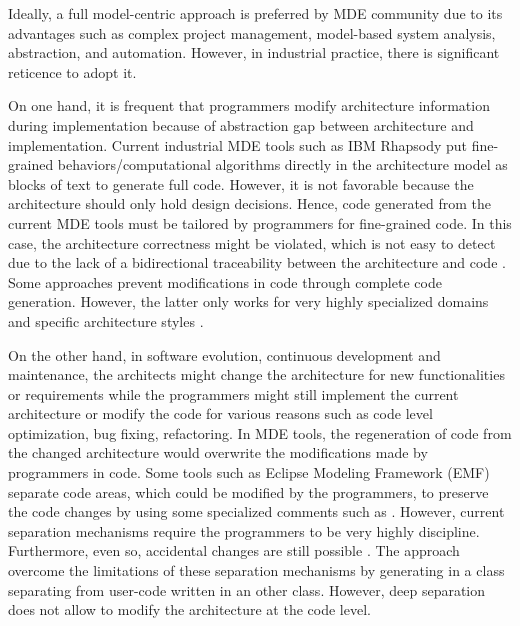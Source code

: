 Ideally, a full model-centric approach is preferred by MDE community due to its advantages \cite{Selic2012} such as complex project management, model-based system analysis, abstraction, and automation. 
However, in industrial practice, there is significant reticence \cite{Hutchinson:2011:MEP:1985793.1985882} to adopt it.

On one hand, it is frequent that programmers modify architecture information during implementation because of abstraction gap between architecture and implementation. %
Current industrial MDE tools such as IBM Rhapsody put fine-grained behaviors/computational algorithms directly in the architecture model as blocks of text to generate full code. 
However, it is %
not favorable because the architecture should only hold design decisions. 
Hence, code generated from the current MDE tools must be tailored by programmers for fine-grained code.
In this case, the architecture correctness might be violated, which is not easy to detect due to the lack of a bidirectional traceability between the architecture and code \cite{ubayashi2010archface}.
Some approaches \cite{kelly2008domain} prevent modifications in code through complete code generation.
However, the latter only works for very highly specialized domains and specific architecture styles \cite{zheng2012enhancing}.

On the other hand, in software evolution, continuous development and maintenance, the architects might change the architecture for new functionalities or requirements while the programmers might still implement the current architecture or modify the code for various reasons such as code level optimization, bug fixing, refactoring. 
In MDE tools, the regeneration of code from the changed architecture would overwrite the modifications made by programmers in code. 
Some tools such as Eclipse Modeling Framework (EMF) \cite{steinberg2008emf} separate code areas, which could be modified by the programmers, to preserve the code changes by using some specialized comments such as .
However, current separation mechanisms require the programmers to be very highly discipline.
Furthermore, even so, accidental changes are still possible \cite{zheng2012enhancing}.
The  approach \cite{zheng2012enhancing} overcome the limitations of these separation mechanisms by generating  in a class separating from user-code written in an other class.
However, deep separation does not allow to modify the architecture at the code level.

